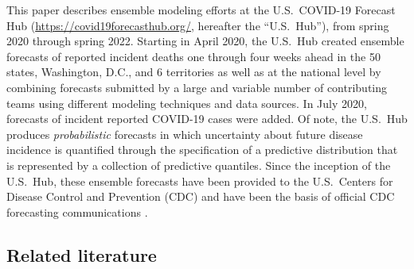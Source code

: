 \documentclass[11pt,3p,authoryear]{elsarticle}
\begin{document}
This paper describes ensemble modeling efforts at the U.S.\ COVID-19 Forecast Hub (\url{https://covid19forecasthub.org/}, hereafter the ``U.S.\ Hub''), from spring 2020 through spring 2022.
Starting in April 2020, the U.S.\ Hub created ensemble forecasts of reported incident deaths one through four weeks ahead in the 50 states, Washington, D.C., and 6 territories as well as at the national level by combining forecasts submitted by a large and variable number of contributing teams using different modeling techniques and data sources.
In July 2020, forecasts of incident reported COVID-19 cases were added.
Of note, the U.S.\ Hub produces \textit{probabilistic} forecasts in which uncertainty about future disease incidence is quantified through the specification of a predictive distribution that is represented by a collection of predictive quantiles.
Since the inception of the U.S.\ Hub, these ensemble forecasts have been provided to the U.S.\ Centers for Disease Control and Prevention (CDC) and have been the basis of official CDC forecasting communications \citep{cdc_covid_modeling}.

\subsection{Related literature}
\end{document}
